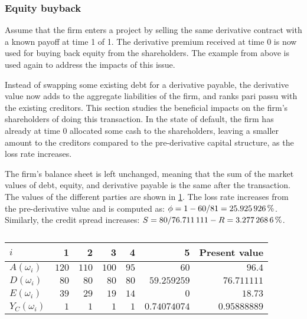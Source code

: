 \documentclass[../main.tex]{subfiles}
\begin{document}
        \subsubsection{Equity buyback}
            Assume that the firm enters a project 
            by selling the same derivative contract with a known payoff at time 1 of 1. 
            The derivative premium received at time 0 is now used for buying back equity from the shareholders. 
            The example from above is used again to address the impacts of this issue.

            Instead of swapping some existing debt for a derivative payable, 
            the derivative value now adds to the aggregate liabilities of the firm, 
            and ranks pari passu with the existing creditors.
            This section studies the beneficial impacts on the firm's shareholders of doing this transaction.
            In the state of default, the firm has already at time 0 allocated some cash to the shareholders, 
            leaving a smaller amount to the creditors compared to the pre-derivative capital structure, 
            as the loss rate increases.

            The firm's balance sheet is left unchanged, meaning that the sum of the market values of debt, equity, 
            and derivative payable is the same after the transaction. 
            The values of the different parties are shown in \cref{tbl:example-equity-buyback}. 
            The loss rate increases from the pre-derivative value and is computed as:
            $\phi = 1 - \num{60}/\num{81} = \pct{0.25925926}$.
            Similarly, the credit spread increases:
            $S = \num{80}/\num{76.711111} - \grossrfrate = \pct{0.032772686}$.
            \begin{table}[H]
                \centering
                \begin{tabular}{l|rrrrr||r}
                    $i$ & 1 & 2 & 3 & 4 & 5 & Present value \\
                    \hline
                    $A(\omega_{i})$ & $\num{120}$ & $\num{110}$ & $\num{100}$ & $\num{95}$ & $\num{60}$ & $\num{96.4}$ \\
                    $D(\omega_{i})$ & $\num{80}$ & $\num{80}$ & $\num{80}$ & $\num{80}$ & $\num{59.259259}$ & $\num{76.711111}$ \\
                    $E(\omega_{i})$ & $\num{39}$ & $\num{29}$ & $\num{19}$ & $\num{14}$ & $\num{0}$ & $\num{18.73}$ \\
                    $Y_C(\omega_{i})$ & $\num{1}$ & $\num{1}$ & $\num{1}$ & $\num{1}$ & $\num{0.74074074}$ & $\num{0.95888889}$ \\
                \end{tabular}
                \caption{}
                \label{tbl:example-equity-buyback}
            \end{table}
\end{document}
